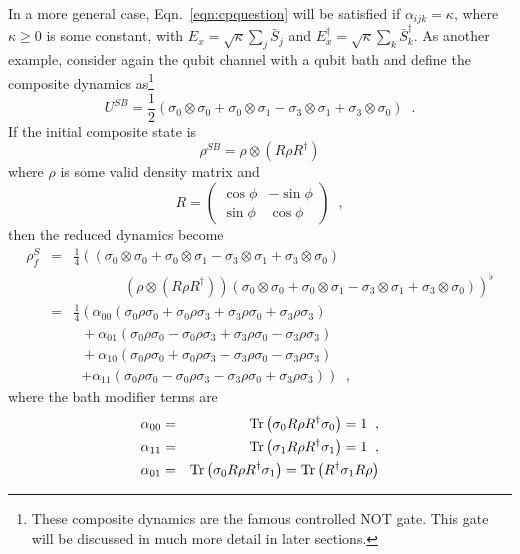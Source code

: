 In a more general case, Eqn.\ \ref{eqn:cpquestion} will be satisfied if $\alpha_{ijk} = \kappa$, where $\kappa\ge 0$ is some constant, with $E_x = \sqrt{\kappa} \sum_j \bar{S}_j$ and $E_x^\dagger = \sqrt{\kappa}\sum_k \bar{S}_k^\dagger$.  As another example, consider again the qubit channel with a qubit bath and define the composite dynamics as\footnote{These composite dynamics are the famous controlled NOT gate.  This gate will be discussed in much more detail in later sections.}
$$
U^{SB} = \frac{1}{2}\left(\sigma_0\otimes\sigma_0 + \sigma_0\otimes\sigma_1 - \sigma_3\otimes\sigma_1 + \sigma_3\otimes\sigma_0\right)\;\;.
$$
If the initial composite state is
$$
\rho^{SB} = \rho\otimes \left(R\rho R^\dagger\right)
$$
where $\rho$ is some valid density matrix and 
$$
R = \begin{pmatrix}
\cos{\phi}&-\sin{\phi}\\
\sin{\phi}&\cos{\phi}
\end{pmatrix}\;\;,
$$
then the reduced dynamics become
\begin{eqnarray*}
\rho^S_f &=& \frac{1}{4}\left( \left( \sigma_0\otimes\sigma_0 + \sigma_0\otimes\sigma_1 - \sigma_3\otimes\sigma_1 + \sigma_3\otimes\sigma_0\right)\right.\\
& &\;\;\;\;\;\;\;\;\;\;\;\;\;\left.\left( \rho\otimes \left(R\rho R^\dagger\right)\right)\left(\sigma_0\otimes\sigma_0 + \sigma_0\otimes\sigma_1 - \sigma_3\otimes\sigma_1 + \sigma_3\otimes\sigma_0\right)\right)^\flat\\
&=& \frac{1}{4}\left( \alpha_{00} \left(\sigma_0\rho\sigma_0 + \sigma_0\rho\sigma_3 + \sigma_3\rho\sigma_0 + \sigma_3\rho\sigma_3\right)\right.\\
& &\;\;+ \alpha_{01} \left( \sigma_0\rho\sigma_0 - \sigma_0\rho\sigma_3 + \sigma_3\rho\sigma_0 - \sigma_3\rho\sigma_3\right)\\
& &\;\; + \alpha_{10}\left( \sigma_0\rho\sigma_0 +\sigma_0\rho\sigma_3 - \sigma_3\rho\sigma_0 - \sigma_3\rho\sigma_3 \right) \\
& &\;\;\left.+ \alpha_{11}\left( \sigma_0\rho\sigma_0 - \sigma_0\rho\sigma_3 - \sigma_3\rho\sigma_0 +\sigma_3\rho\sigma_3 \right) \right)\;\;,
\end{eqnarray*}
where the bath modifier terms are
\begin{eqnarray*}
\alpha_{00} &=& \operatorname{Tr}\left( \sigma_0 R \rho R^\dagger \sigma_0 \right) = 1\;\;,\\
\alpha_{11} &=& \operatorname{Tr}\left( \sigma_1 R \rho R^\dagger \sigma_1 \right) = 1\;\;,\\
\alpha_{01} &=& \operatorname{Tr}\left( \sigma_0 R \rho R^\dagger \sigma_1 \right) = \operatorname{Tr}\left( R^\dagger \sigma_1 R \rho \right)
\end{eqnarray*}
